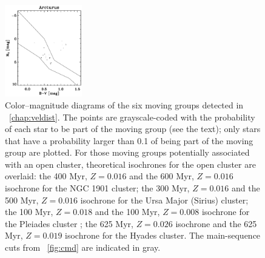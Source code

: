 \begin{figure}
\includegraphics[width=0.3\textwidth]{figs_groups/cmd_arcturus.ps}
\caption[Color--magnitude diagrams of the six moving groups detected
in \chaptername~\ref{chap:veldist}]{Color--magnitude diagrams of the
six moving groups detected in \chaptername~\ref{chap:veldist}. The
points are grayscale-coded with the probability of each star to be
part of the moving group (see the text); only stars that have a
probability larger than 0.1 of being part of the moving group are
plotted. For those moving groups potentially associated with an open
cluster, theoretical isochrones \citep{Marigo08a,Bertelli94a} for the
open cluster are overlaid: the 400 Myr, $Z=0.016$
\citep{Carraro07a} and the 600 Myr, $Z=0.016$ \citep{Pavani01a}
isochrone for the NGC 1901 cluster; the 300 Myr, $Z=0.016$
\citep{1993AJ....105..226S} and the 500 Myr, $Z=0.016$ \citep{King03a}
isochrone for the Ursa Major (Sirius) cluster; the 100 Myr, $Z= 0.018$
\citep{Boesgaard90a,Gratton00a} and the 100 Myr, $Z=0.008$
\citep{Percival05a} isochrone for the Pleiades cluster ; the 625 Myr,
$Z = 0.026$ isochrone \citep{Perryman98a} and the 625 Myr, $Z=0.019$
isochrone for the Hyades cluster. The main-sequence cuts from
\figurename~\ref{fig:cmd} are indicated in gray.}\label{fig:groupcmd}
\end{figure}

